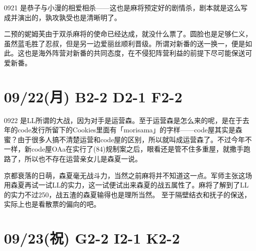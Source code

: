 0921 是恭子与小漫的相爱相杀——这也是麻将预定好的剧情杀，剧本就是这么写成并演出的，孰攻孰受也是清晰明了。

二预的妮姆芙由于双杀麻将的使命已经达成，就没什么票了。圆脸也是足够仁义，虽然蓝毛胜了忍叔，但是另一边爱丽丝顺利晋级。所谓对新番的送一换一，便是如此。这也是海外阵营对新番的共同态度，在不侵犯阵营利益的前提下尽可能保送可爱新番。

\section{09/22(月) B2-2 D2-1 F2-2}


0922 是LL所谓的大战，因为对手是运营森。至于运营森是怎么来的呢，是在于去年的code发行所留下的Cookies里面有「morisama」的字样——code屋其实是森蜜？由于很多人搞不清楚运营和code屋的区别，所以就叫成运营森了。不过今年不一样，新code屋OAa在实行了(84)规制案之后，眼看还是管不住多重屋，就撒手跑路了，所以也不存在运营亲女儿是森夏一说。

京都衰落的日萌，森夏毫无战斗力，当然之前麻将并不知道这一点。军师主张这场用森夏再试一试LL的实力，这一试便试出来森夏的战五属性了。麻将了解到了LL的实力不过250，战五渣的森夏输得也是理所当然。
至于隔壁结衣和抚子的保送，实际上也是看散票的偏向的吧。

\section{09/23(祝) G2-2 I2-1 K2-2}


